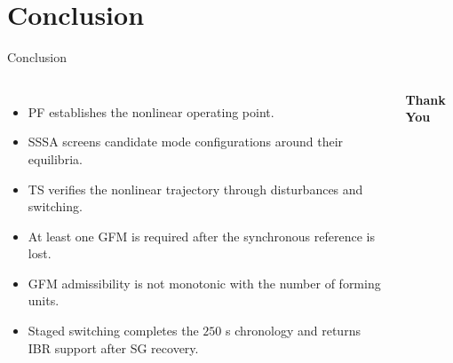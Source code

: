 \documentclass{beamer}
\begin{document}
\section{Conclusion}
\begin{frame}{Conclusion}
\begin{columns}[c,onlytextwidth]
\small
\begin{itemize}
  \item PF establishes the nonlinear operating point.
  \item SSSA screens candidate mode configurations around their equilibria.
  \item TS verifies the nonlinear trajectory through disturbances and switching.
  \item At least one GFM is required after the synchronous reference is lost.
  \item GFM admissibility is not monotonic with the number of forming units.
  \item Staged switching completes the $250$ s chronology and returns IBR support after SG recovery.
\end{itemize}
\centering
{}
\vspace{0.35cm}
{\Large\bfseries Thank You}
\end{columns}
\end{frame}
\end{document}
